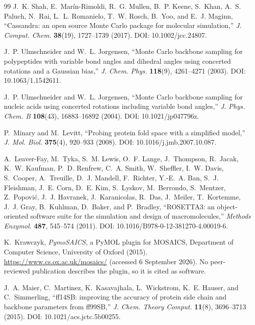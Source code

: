 \begin{thebibliography}{99}
J.~K. Shah, E.~Mar\'in-Rimoldi, R.~G. Mullen, B.~P. Keene, S.~Khan,
A.~S. Paluch, N.~Rai, L.~L. Romanielo, T.~W. Rosch, B.~Yoo, and E.~J. Maginn,
``Cassandra: an open source Monte Carlo package for molecular simulation,''
\emph{J. Comput. Chem.} \textbf{38}(19), 1727--1739 (2017).
DOI: 10.1002/jcc.24807.

J.~P. Ulmschneider and W.~L. Jorgensen,
``Monte Carlo backbone sampling for polypeptides with variable bond angles and
dihedral angles using concerted rotations and a Gaussian bias,''
\emph{J. Chem. Phys.} \textbf{118}(9), 4261--4271 (2003).
DOI: 10.1063/1.1542611.

J.~P. Ulmschneider and W.~L. Jorgensen,
``Monte Carlo backbone sampling for nucleic acids using concerted rotations
including variable bond angles,''
\emph{J. Phys. Chem. B} \textbf{108}(43), 16883--16892 (2004).
DOI: 10.1021/jp047796z.

P.~Minary and M.~Levitt,
``Probing protein fold space with a simplified model,''
\emph{J. Mol. Biol.} \textbf{375}(4), 920--933 (2008).
DOI: 10.1016/j.jmb.2007.10.087.

A.~Leaver-Fay, M.~Tyka, S.~M. Lewis, O.~F. Lange, J.~Thompson, R.~Jacak,
K.~W. Kaufman, P.~D. Renfrew, C.~A. Smith, W.~Sheffler, I.~W. Davis, S.~Cooper,
A.~Treuille, D.~J. Mandell, F.~Richter, Y.-E.~A. Ban, S.~J. Fleishman,
J.~E. Corn, D.~E. Kim, S.~Lyskov, M.~Berrondo, S.~Mentzer, Z.~Popovi\'c,
J.~J. Havranek, J.~Karanicolas, R.~Das, J.~Meiler, T.~Kortemme, J.~J. Gray,
B.~Kuhlman, D.~Baker, and P.~Bradley,
``ROSETTA3: an object-oriented software suite for the simulation and design of
macromolecules,''
\emph{Methods Enzymol.} \textbf{487}, 545--574 (2011).
DOI: 10.1016/B978-0-12-381270-4.00019-6.

K.~Krawczyk, \emph{PymoSAICS}, a PyMOL plugin for MOSAICS, Department of
Computer Science, University of Oxford (2015).
\url{https://www.cs.ox.ac.uk/mosaics/} (accessed 6 September 2026). No
peer-reviewed publication describes the plugin, so it is cited as software.

J.~A. Maier, C.~Martinez, K.~Kasavajhala, L.~Wickstrom, K.~E. Hauser, and
C.~Simmerling,
``ff14SB: improving the accuracy of protein side chain and backbone parameters
from ff99SB,''
\emph{J. Chem. Theory Comput.} \textbf{11}(8), 3696--3713 (2015).
DOI: 10.1021/acs.jctc.5b00255.


\end{thebibliography}
